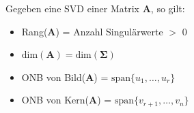 \documentclass[11pt]{article}
\begin{document}
Gegeben eine SVD einer Matrix $\mathbf{A}$, so gilt:
\vspace*{-0.5cm}
\begin{itemize}
    \item Rang($\mathbf{A}$) = Anzahl Singulärwerte $>$ 0
    \item $\text{dim}(\mathbf{A}) = \text{dim}(\mathbf{\Sigma})$
    \item ONB von Bild($\mathbf{A}$) = $\text{span}\{u_1, \dots, u_r\}$
    \item ONB von Kern($\mathbf{A}$) = $\text{span}\{v_{r+1}, \dots, v_n\}$
\end{itemize}
\end{document}
